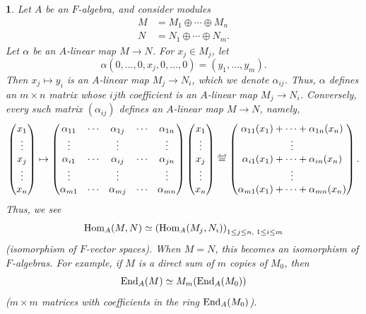 \documentclass[a4paper,11pt,final]{memoir}%
\newtheorem{plain}[X]{}
\theoremstyle{nonumberplain}
\begin{document}
\begin{plain}
\label{r25}Let $A$ be an $F$-algebra, and consider modules%
\begin{align*}
M  &  =M_{1}\oplus\cdots\oplus M_{n}\\
N  &  =N_{1}\oplus\cdots\oplus N_{m}.
\end{align*}
Let $\alpha$ be an $A$-linear map $M\rightarrow N$. For $x_{j}\in M_{j}$, let%
\[
\alpha(0,\ldots,0,x_{j},0,\ldots,0)=(y_{1},\ldots,y_{m}).
\]
Then $x_{j}\mapsto y_{i}$ is an $A$-linear map $M_{j}\rightarrow N_{i}$, which
we denote $\alpha_{ij}$. Thus, $\alpha$ defines an $m\times n$ matrix whose
$ij$th coefficient is an $A$-linear map $M_{j}\rightarrow N_{i}$. Conversely,
every such matrix $(\alpha_{ij})$ defines an $A$-linear map $M\rightarrow N$,
namely,%
\[%
\begin{pmatrix}
x_{1}\\
\vdots\\
x_{j}\\
\vdots\\
x_{n}%
\end{pmatrix}
\mapsto%
\begin{pmatrix}
\alpha_{11} & \cdots & \alpha_{1j} & \cdots & \alpha_{1n}\\
\vdots &  & \vdots &  & \vdots\\
\alpha_{i1} & \cdots & \alpha_{ij} & \cdots & \alpha_{jn}\\
\vdots &  & \vdots &  & \vdots\\
\alpha_{m1} & \cdots & \alpha_{mj} & \cdots & \alpha_{mn}%
\end{pmatrix}%
\begin{pmatrix}
x_{1}\\
\vdots\\
x_{j}\\
\vdots\\
x_{n}%
\end{pmatrix}
\overset{\df}{=}%
\begin{pmatrix}
\alpha_{11}(x_{1})+\cdots+\alpha_{1n}(x_{n})\\
\vdots\\
\alpha_{i1}(x_{1})+\cdots+\alpha_{in}(x_{n})\\
\vdots\\
\alpha_{m1}(x_{1})+\cdots+\alpha_{mn}(x_{n})
\end{pmatrix}
.
\]
Thus, we see%
\begin{equation}
\Hom_{A}(M,N)\simeq\left(  \Hom_{A}(M_{j},N_{i})\right)  _{1\leq j\leq
n\text{, }1\leq i\leq m} \label{e22}%
\end{equation}
(isomorphism of $F$-vector spaces). When $M=N$, this becomes an isomorphism of
$F$-algebras. For example, if $M$ is a direct sum of $m$ copies of $M_{0}$,
then%
\begin{equation}
\End_{A}(M)\simeq M_{m}(\End_{A}(M_{0})) \label{e23}%
\end{equation}
($m\times m$ matrices with coefficients in the ring $\operatorname{End}_{A}(M_{0})$).
\end{plain}
\end{document}
